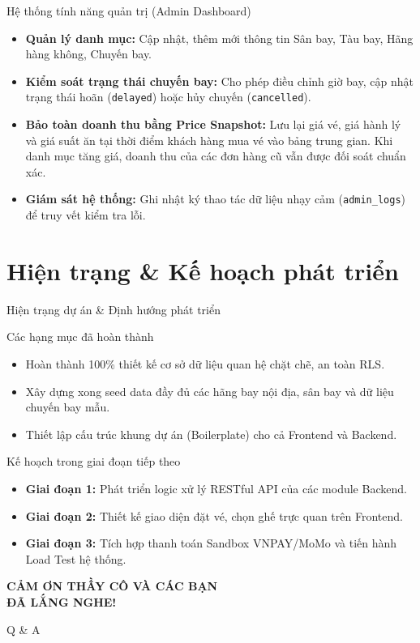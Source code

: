 \documentclass{beamer}
\begin{document}
\begin{frame}{Hệ thống tính năng quản trị (Admin Dashboard)}
  \begin{itemize}
    \item \textbf{Quản lý danh mục:} Cập nhật, thêm mới thông tin Sân bay, Tàu bay, Hãng hàng không, Chuyến bay.
    \item \textbf{Kiểm soát trạng thái chuyến bay:} Cho phép điều chỉnh giờ bay, cập nhật trạng thái hoãn (\texttt{delayed}) hoặc hủy chuyến (\texttt{cancelled}).
    \item \textbf{Bảo toàn doanh thu bằng Price Snapshot:} Lưu lại giá vé, giá hành lý và giá suất ăn tại thời điểm khách hàng mua vé vào bảng trung gian. Khi danh mục tăng giá, doanh thu của các đơn hàng cũ vẫn được đối soát chuẩn xác.
    \item \textbf{Giám sát hệ thống:} Ghi nhật ký thao tác dữ liệu nhạy cảm (\texttt{admin\_logs}) để truy vết kiểm tra lỗi.
  \end{itemize}
\end{frame}

\section{Hiện trạng & Kế hoạch phát triển}

\begin{frame}{Hiện trạng dự án \& Định hướng phát triển}
  \begin{block}{Các hạng mục đã hoàn thành}
    \begin{itemize}
      \item Hoàn thành 100\% thiết kế cơ sở dữ liệu quan hệ chặt chẽ, an toàn RLS.
      \item Xây dựng xong seed data đầy đủ các hãng bay nội địa, sân bay và dữ liệu chuyến bay mẫu.
      \item Thiết lập cấu trúc khung dự án (Boilerplate) cho cả Frontend và Backend.
    \end{itemize}
  \end{block}
  \begin{block}{Kế hoạch trong giai đoạn tiếp theo}
    \begin{itemize}
      \item \textbf{Giai đoạn 1:} Phát triển logic xử lý RESTful API của các module Backend.
      \item \textbf{Giai đoạn 2:} Thiết kế giao diện đặt vé, chọn ghế trực quan trên Frontend.
      \item \textbf{Giai đoạn 3:} Tích hợp thanh toán Sandbox VNPAY/MoMo và tiến hành Load Test hệ thống.
    \end{itemize}
  \end{block}
\end{frame}

{
  \begin{frame}
    \centering
    \color{white}
    \Huge \textbf{CẢM ƠN THẦY CÔ VÀ CÁC BẠN\\ĐÃ LẮNG NGHE!}
    
    \vspace{1.5cm}
    \Large \color{porange} Q \& A
  \end{frame}
}
\end{document}
